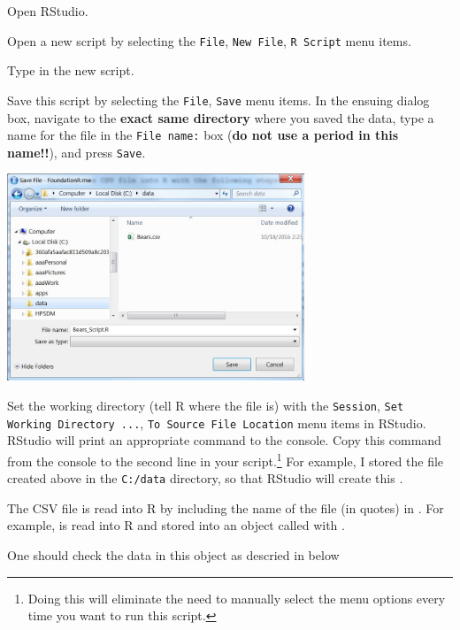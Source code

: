 \documentclass[10pt,openany]{book}\usepackage[]{graphicx}\usepackage[]{color}
\begin{document}
\begin{Itemize}
  \item Open RStudio.
  \item Open a new script by selecting the \verb"File", \verb"New File", \verb"R Script" menu items.
  \item Type  in the new script.
  \item Save this script by selecting the \verb"File", \verb"Save" menu items.  In the ensuing dialog box, navigate to the \textbf{exact same directory} where you saved the data, type a name for the file in the \verb"File name:" box (\textbf{do not use a period in this name!!}), and press \verb"Save".

\begin{center}
  \includegraphics[width=3.5in]{Figs/Data_File_3.jpg}
\end{center}

  \item Set the working directory (tell R where the file is) with the \verb"Session", \verb"Set Working Directory ...", \verb"To Source File Location" menu items in RStudio.  RStudio will print an appropriate  command to the console.  Copy this command from the console to the second line in your script.\footnote{Doing this will eliminate the need to manually select the menu options every time you want to run this script.}  For example, I stored the file created above in the \verb"C:/data" directory, so that RStudio will create this .
  \item The CSV file is read into R by including the name of the file (in quotes) in .  For example,  is read into R and stored into an object called  with .


  \item One should check the data in this object as descried in  below
\end{Itemize}
\end{document}
